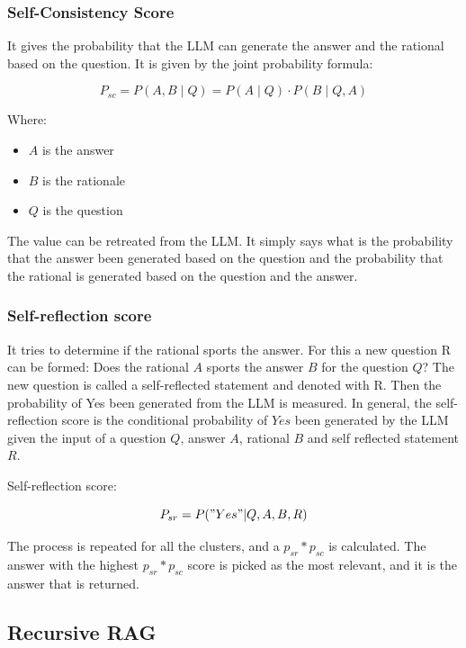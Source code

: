 \documentclass{wseas}
\begin{document}
\subsubsection{Self-Consistency Score}

It gives the probability that the LLM can generate the answer and the
rational based on the question. It is given by the joint probability
formula:

\begin{equation}
  P_{sc} = P(A,B \mid Q) = P(A \mid Q) \cdot P(B \mid Q, A)
\end{equation}
  
Where:
\begin{itemize}
  \item \( A \) is the answer
  \item \( B \) is the rationale
  \item \( Q \) is the question
\end{itemize}

The value can be retreated from the LLM. It simply says what is the
probability that the answer been generated based on the question and the
probability that the rational is generated based on the question and the
answer.

\subsubsection{Self-reflection score}

It tries to determine if the rational sports the answer. For this a new
question R can be formed: Does the rational $A$ sports the answer
$B$ for the question $Q$? The new question is called a
self-reflected statement and denoted with R. Then the probability of Yes
been generated from the LLM is measured. In general, the self-reflection
score is the conditional probability of $Yes$ been generated by the
LLM given the input of a question $Q$, answer $A$, rational $B$ and self
reflected statement $R$.

Self-reflection score: 

\begin{equation}
  P_{sr} = P("Yes"|Q, A, B, R)  
\end{equation}

The process is repeated for all the clusters, and a \(p_{sr}*p_{sc}\) is
calculated. The answer with the highest \(p_{sr}*p_{sc}\) score is
picked as the most relevant, and it is the answer that is returned.


\subsection{Recursive RAG}
\end{document}
